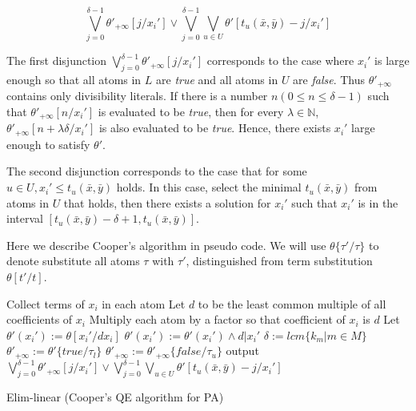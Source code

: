 {$$\bigvee_{j=0}^{\delta-1} \theta'_{+\infty}[j/x_i'] \vee 
\bigvee_{j=0}^{\delta-1} \bigvee_{u\in U} \theta'[t_u(\bar{x},\bar{y})-j/x_i']$$

The first disjunction $\bigvee_{j=0}^{\delta-1} \theta'_{+\infty}[j/x_i']$ corresponds to the case where $x_i'$ is large enough 
so that all atoms in $L$ are \textit{true} and all atoms in  $U$ are \textit{false}. Thus $\theta'_{+\infty}$  contains only divisibility literals.
If there is a number $n (0\le n \le \delta-1)$ such that $ \theta'_{+\infty}[n/x_i']$ is evaluated to be \textit{true},
then for every $\lambda\in \mathbb{N}$,
$\theta'_{+\infty}[n+\lambda\delta/x_i']$ is also evaluated to be \textit{true}.
Hence, there exists $x_i'$ large enough to satisfy $\theta'$.

The second disjunction corresponds to the case that for 
some $u\in U, x_i'\le t_u(\bar{x},\bar{y})$ holds.
In this case, 
select the minimal $t_u(\bar{x},\bar{y})$
from atoms in $U$ that holds,
then there exists a solution for $x_i'$ such that $x_i'$ is in the interval $[t_u(\bar{x},\bar{y})-\delta+1,t_u(\bar{x},\bar{y})]$.

Here we describe Cooper's algorithm in pseudo code.
We will use $\theta\{\tau'/\tau\}$ to denote substitute all atoms $\tau$ with $\tau'$,
distinguished from term substitution $\theta[t'/t]$.

\begin{algorithm}[t]
    \SetAlgoLined
    
    Collect terms of $x_i$ in each atom\;
    Let $d$ to be the least common multiple of all coefficients of $x_i$\;
    Multiply each atom by a factor so that coefficient of $x_i $ is $d$\;
    Let $\theta'(x_i'):= \theta[x_i'/dx_i]$\;
    $\theta'(x_i') := \theta'(x_i') \wedge d| x_i'$\;
    $\delta :=  lcm\{k_m|m\in M\}$\;
    {
        $\theta'_{+\infty}:=  \theta'\{\textit{true}/\tau_l\}$
    }
    {
        $\theta'_{+\infty}:=  \theta'_{+\infty}\{\textit{false}/\tau_u\}$
    }
    output $\bigvee_{j=0}^{\delta-1} \theta'_{+\infty}[j/x_i'] \vee \bigvee_{j=0}^{\delta-1} \bigvee_{u\in U}\theta'[t_u(\bar{x},\bar{y})-j/x_i']$
    \caption{Elim-linear (Cooper's QE algorithm for PA)}
\end{algorithm}


}
